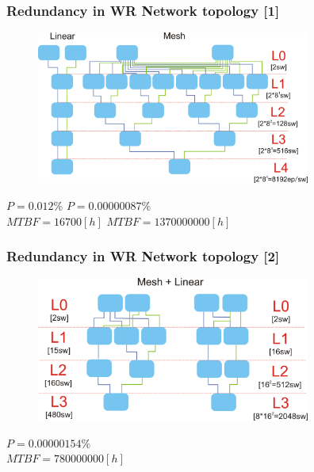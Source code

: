 \documentclass[]{beamer}
\begin{document}
\begin{frame}
  \frametitle{Redundancy in WR Network topology [1]}


\begin{figure}[tbp] %
  \centering
  \includegraphics[width=9cm,keepaspectratio]{../../figures/network/network_topology_0.png}

\end{figure}

$P=0.012\%$  \hspace{4cm}   $P=0.00000087\%$  \\   
$MTBF=16700[h]$ \hspace{2cm} $MTBF=1370000000[h]$ 

\end{frame}

\begin{frame}
  \frametitle{Redundancy in WR Network topology [2]}



\begin{figure}[tbp] %
  \centering

  \includegraphics[width=9cm,keepaspectratio]{../../figures/network/network_topology.png}

\end{figure}
\hspace{4cm}$P=0.00000154\%$    \\
\hspace{4cm}$MTBF=780000000[h]$ 

  \end{frame}
\end{document}
